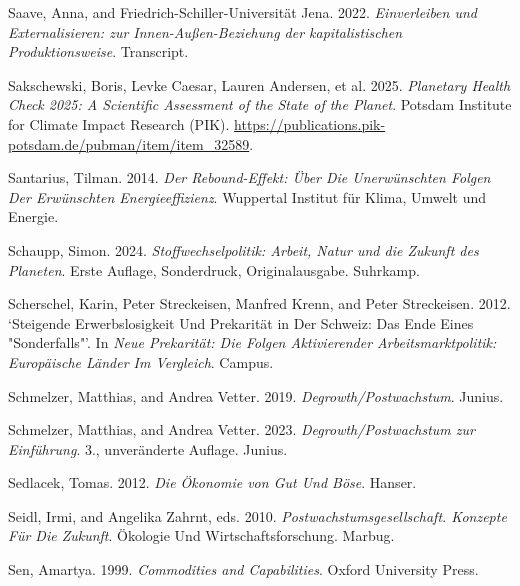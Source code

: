 \documentclass[
  british,
  a4paper,
  DIV=11,
  numbers=noendperiod,
  oneside,
  openany]{scrreprt}
\newlength{\cslhangindent}
\newenvironment{CSLReferences}[2] %
 {\begin{list}{}{%
  \setlength{\itemindent}{0pt}
  \setlength{\leftmargin}{0pt}
  \setlength{\parsep}{0pt}
  \ifodd #1
   \setlength{\leftmargin}{\cslhangindent}
   \setlength{\itemindent}{-1\cslhangindent}
  \fi
  \setlength{\itemsep}{#2\baselineskip}}}
 {\end{list}}
\begin{document}
\begin{CSLReferences}{1}{1}
Saave, Anna, and Friedrich-Schiller-Universität Jena. 2022.
\emph{Einverleiben und Externalisieren: zur Innen-Außen-Beziehung der
kapitalistischen Produktionsweise}. Transcript.

Sakschewski, Boris, Levke Caesar, Lauren Andersen, et al. 2025.
\emph{Planetary Health Check 2025: A Scientific Assessment of the State
of the Planet}. Potsdam Institute for Climate Impact Research (PIK).
\url{https://publications.pik-potsdam.de/pubman/item/item_32589}.

Santarius, Tilman. 2014. \emph{Der Rebound-Effekt: Über Die
Unerwünschten Folgen Der Erwünschten Energieeffizienz}. Wuppertal
Institut für Klima, Umwelt und Energie.

Schaupp, Simon. 2024. \emph{Stoffwechselpolitik: Arbeit, Natur und die
Zukunft des Planeten}. Erste Auflage, Sonderdruck, Originalausgabe.
Suhrkamp.

Scherschel, Karin, Peter Streckeisen, Manfred Krenn, and Peter
Streckeisen. 2012. {`Steigende Erwerbslosigkeit Und Prekarität in Der
Schweiz: Das Ende Eines "Sonderfalls"'}. In \emph{Neue Prekarität: Die
Folgen Aktivierender Arbeitsmarktpolitik: Europäische Länder Im
Vergleich}. Campus.

Schmelzer, Matthias, and Andrea Vetter. 2019.
\emph{Degrowth/Postwachstum}. Junius.

Schmelzer, Matthias, and Andrea Vetter. 2023.
\emph{Degrowth/Postwachstum zur Einführung}. 3., unveränderte Auflage.
Junius.

Sedlacek, Tomas. 2012. \emph{Die Ökonomie von Gut Und Böse}. Hanser.

Seidl, Irmi, and Angelika Zahrnt, eds. 2010.
\emph{Postwachstumsgesellschaft. {Konzepte} Für Die {Zukunft}}. Ökologie
Und {Wirtschaftsforschung}. Marbug.

Sen, Amartya. 1999. \emph{Commodities and {Capabilities}}. Oxford
University Press.


\end{CSLReferences}
\end{document}
